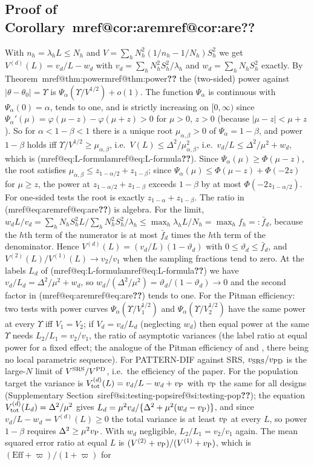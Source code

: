 \documentclass[pdflatex,sn-mathphys-num,iicol]{sn-jnl}
\makeatletter
\theoremstyle{thmstyleone}
\theoremstyle{thmstyletwo}
\theoremstyle{thmstylethree}
\newcommand{\SIref}[1]{\ifcsname siref@#1\endcsname\csname siref@#1\endcsname\else\textbf{??}\fi}
\newcommand{\Mref}[1]{\ifcsname mref@#1\endcsname\csname mref@#1\endcsname\else\textbf{??}\fi}
\makeatother
\begin{document}
\subsection{Proof of Corollary~\Mref{cor:are}}\label{si:testing-are}

With $n_h=\lambda_hL\le N_h$ and $V=\sum_hN_h^2(1/n_h-1/N_h)S_h^2$ we get $V^{(d)}(L)=v_d/L-w_d$ with $v_d=\sum_hN_h^2S_h^2/\lambda_h$ and $w_d=\sum_hN_hS^2_h$ exactly. By Theorem~\Mref{thm:power} the (two-sided) power against $|\theta-\theta_0|=\Upsilon$ is $\Psi_\alpha(\Upsilon/V^{1/2})+o(1)$. The function $\Psi_\alpha$ is continuous with $\Psi_\alpha(0)=\alpha$, tends to one, and is strictly increasing on $[0,\infty)$ since $\Psi_\alpha'(\mu)=\varphi(\mu-z)-\varphi(\mu+z)>0$ for $\mu>0$, $z>0$ (because $|\mu-z|<\mu+z$). So for $\alpha<1-\beta<1$ there is a unique root $\mu_{\alpha,\beta}>0$ of $\Psi_\alpha=1-\beta$, and power $1-\beta$ holds iff $\Upsilon/V^{1/2}\ge\mu_{\alpha,\beta}$, i.e.\ $V(L)\le\Delta^2/\mu^2_{\alpha,\beta}$, i.e.\ $v_d/L\le\Delta^2/\mu^2+w_d$, which is (\Mref{eq:L-formula}). Since $\Psi_\alpha(\mu)\ge\Phi(\mu-z)$, the root satisfies $\mu_{\alpha,\beta}\le z_{1-\alpha/2}+z_{1-\beta}$; since $\Psi_\alpha(\mu)\le\Phi(\mu-z)+\Phi(-2z)$ for $\mu\ge z$, the power at $z_{1-\alpha/2}+z_{1-\beta}$ exceeds $1-\beta$ by at most $\Phi(-2z_{1-\alpha/2})$. For one-sided tests the root is exactly $z_{1-\alpha}+z_{1-\beta}$. The ratio in (\Mref{eq:are}) is algebra. For the limit, $w_dL/v_d=\sum_hN_hS^2_hL\big/\sum_hN_h^2S^2_h/\lambda_h\le\max_h\lambda_hL/N_h=\max_hf_h=:\bar f_d$, because the $h$th term of the numerator is at most $\bar f_d$ times the $h$th term of the denominator. Hence $V^{(d)}(L)=(v_d/L)(1-\vartheta_d)$ with $0\le\vartheta_d\le\bar f_d$, and $V^{(2)}(L)/V^{(1)}(L)\to v_2/v_1$ when the sampling fractions tend to zero. At the labels $L_d$ of (\Mref{eq:L-formula}) we have $v_d/L_d=\Delta^2/\mu^2+w_d$, so $w_d/(\Delta^2/\mu^2)=\vartheta_d/(1-\vartheta_d)\to0$ and the second factor in (\Mref{eq:are}) tends to one. For the Pitman efficiency: two tests with power curves $\Psi_\alpha(\Upsilon/V_1^{1/2})$ and $\Psi_\alpha(\Upsilon/V_2^{1/2})$ have the same power at every $\Upsilon$ iff $V_1=V_2$; if $V_d=v_d/L_d$ (neglecting $w_d$) then equal power at the same $\Upsilon$ needs $L_2/L_1=v_2/v_1$, the ratio of asymptotic variances (the label ratio at equal power for a fixed effect; the analogue of the Pitman efficiency of \citealt[Ch.~14]{vandervaart1998} and \citealt{noether1955}, there being no local parametric sequence). For PATTERN-DIF against SRS, $v_{\rm SRS}/v_{\rm PD}$ is the large-$N$ limit of $V^{\rm SRS}/V^{\rm PD}$, i.e.\ the efficiency of the paper. For the population target the variance is $V^{(d)}_{\rm tot}(L)=v_d/L-w_d+v_{\rm P}$ with $v_{\rm P}$ the same for all designs (Supplementary Section~\SIref{si:testing-pop}); the equation $V_{\rm tot}^{(d)}(L_d)=\Delta^2/\mu^2$ gives $L_d=\mu^2v_d/\{\Delta^2+\mu^2(w_d-v_{\rm P})\}$, and since $v_d/L-w_d=V^{(d)}(L)\ge0$ the total variance is at least $v_{\rm P}$ at every $L$, so power $1-\beta$ requires $\Delta^2\ge\mu^2v_{\rm P}$. With $w_d$ negligible, $L_2/L_1=v_2/v_1$ again. The mean squared error ratio at equal $L$ is $(V^{(2)}+v_{\rm P})/(V^{(1)}+v_{\rm P})$, which is $(\mathrm{Eff}+\varpi)/(1+\varpi)$ for 
\end{document}
